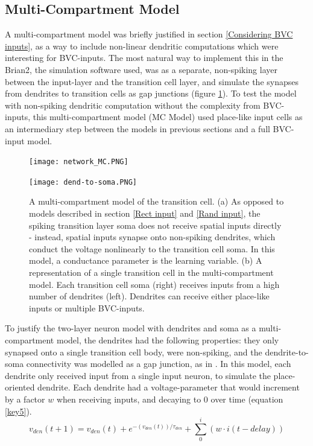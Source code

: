 \documentclass{article}
\begin{document}
    \subsection{Multi-Compartment Model} \label{MC Model}
    A multi-compartment model was briefly justified in section \ref{Considering BVC inputs}, as a way to include non-linear dendritic computations which were interesting for BVC-inputs. The most natural way to implement this in the Brian2, the simulation software used, was as a separate, non-spiking layer between the input-layer and the transition cell layer, and simulate the synapses from dendrites to transition cells as gap junctions (figure \ref{network_MC}). To test the model with non-spiking dendritic computation without the complexity from BVC-inputs, this multi-compartment model (MC Model) used place-like input cells as an intermediary step between the models in previous sections and a full BVC-input model.

    \begin{figure}[h]
        \begin{minipage}[b]{\textwidth}
            \subcaption{}
            \texttt{[image: network\_MC.PNG]}
        \end{minipage}
        \begin{minipage}[t]{0.35\textwidth}
            \subcaption{}
            \texttt{[image: dend-to-soma.PNG]}
        \end{minipage}
        \hspace{0.1\textwidth}
        \begin{minipage}[t]{0.54\textwidth}
            \caption{A multi-compartment model of the transition cell. (a) As opposed to models described in section \ref{Rect input} and \ref{Rand input}, the spiking transition layer soma does not receive spatial inputs directly - instead, spatial inputs synapse onto non-spiking dendrites, which conduct the voltage nonlinearly to the transition cell soma. In this model, a conductance parameter is the learning variable. (b) A representation of a single transition cell in the multi-compartment model. Each transition cell soma (right) receives inputs from a high number of dendrites (left). Dendrites can receive either place-like inputs or multiple BVC-inputs.}
            \label{network_MC}
        \end{minipage}
    \end{figure}

    To justify the two-layer neuron model with dendrites and soma as a multi-compartment model, the dendrites had the following properties: they only synapsed onto a single transition cell body, were non-spiking, and the dendrite-to-soma connectivity was modelled as a gap junction, as in \parencite{Alabi2022}. In this model, each dendrite only received input from a single input neuron, to simulate the place-oriented dendrite. Each dendrite had a voltage-parameter that would increment by a factor \(w\) when receiving inputs, and decaying to 0 over time (equation \ref{key5}).
        \begin{equation}\label{key5} v_{den}(t + 1) = v_{den}(t) + e^{-(v_{den}(t))/\tau_{den}} + \sum_{0}^{i} (w \cdot i(t-delay)) \end{equation}
    
\end{document}
